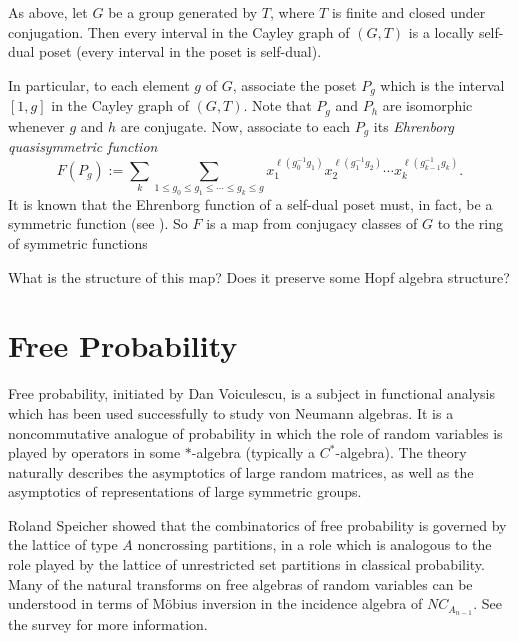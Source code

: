 \documentclass[12pt,letterpaper, reqno]{aimpl}
\begin{document}
\begin{problemblock}
As above, let $G$ be a group generated by $T$, where $T$ is finite and closed under conjugation. Then every interval in the Cayley graph of $(G,T)$ is a locally self-dual poset (every interval in the poset is self-dual).

In particular, to each element $g$ of $G$, associate the poset $P_g$ which is the interval $[1,g]$ in the Cayley graph of $(G,T)$. Note that $P_g$ and $P_h$ are isomorphic whenever $g$ and $h$ are conjugate. Now, associate to each $P_g$ its \emph{Ehrenborg quasisymmetric function}
\begin{equation*}
F(P_g):= \sum_k \sum_{1\leq g_0\leq g_1\leq\cdots\leq g_k\leq g} x_1^{\ell(g_0^{-1}g_1)}x_2^{\ell(g_1^{-1}g_2)}\cdots x_k^{\ell(g_{k-1}^{-1}g_k)}.
\end{equation*}
It is known that the Ehrenborg function of a self-dual poset must, in fact, be a symmetric function (see \cite{stanley}). So $F$ is a map from conjugacy classes of $G$ to the ring of symmetric functions

\begin{problem}[4.4]
What is the structure of this map? Does it preserve some Hopf algebra structure?\end{problem}

\end{problemblock}

\section{Free Probability}
Free probability, initiated by Dan Voiculescu, is a subject in functional analysis which has been used successfully to study von Neumann algebras. It is a noncommutative analogue of probability in which the role of random variables is played by operators in some $*$-algebra (typically a $C^*$-algebra). The theory naturally describes the asymptotics of large random matrices, as well as the asymptotics of representations of large symmetric groups.

Roland Speicher showed that the combinatorics of free probability is governed by the lattice of type $A$ noncrossing partitions, in a role which is analogous to the role played by the lattice of unrestricted set partitions in classical probability. Many of the natural transforms on free algebras of random variables can be understood in terms of M\"{o}bius inversion in the incidence algebra of $NC_{A_{n-1}}$. See the survey \cite{speicher:survey} for more information.
\end{document}
